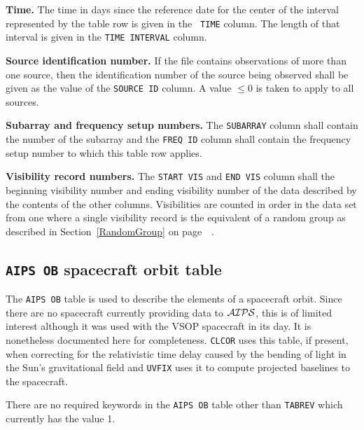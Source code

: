 \documentclass[twoside]{article}
\newcommand{\AIPS}{{$\cal AIPS\/$}}
\begin{document}
{\bf Time.} The time in days since the reference date for the center
of the interval represented by the table row is given in the {\tt
  TIME} column.  The length of that interval is given in the {\tt TIME
  INTERVAL} column.

{\bf Source identification number.} If the file contains observations
of more than one source, then the identification number of the source
being observed shall be given as the value of the {\tt SOURCE ID}
column.  A value $\leq 0$ is taken to apply to all sources.

{\bf Subarray and frequency setup numbers.}  The {\tt SUBARRAY} column
shall contain the number of the subarray  and the {\tt FREQ ID} column
shall contain the frequency setup number to which this table row
applies.

{\bf Visibility record numbers.} The {\tt START VIS} and {\tt END VIS}
column shall the beginning visibility number and ending visibility
number of the data described by the contents of the other columns.
Visibilities are counted in order in the data set from one where a
single visibility record is the equivalent of a random group as
described in Section~\ref{RandomGroup} on page~~\pageref{RandomGroup}.

\subsection{{\tt AIPS OB} spacecraft orbit table}
\label{s:OB}

The {\tt AIPS OB} table is used to describe the elements of a
spacecraft orbit.  Since there are no spacecraft currently providing
data to \AIPS, this is of limited interest although it was used with
the VSOP spacecraft in its day.  It is nonetheless documented here
for completeness.  {\tt CLCOR} uses this table, if present, when
correcting for the relativistic time delay caused by the bending of
light in the Sun's gravitational field and {\tt UVFIX} uses it to
compute projected baselines to the spacecraft.

There are no required keywords in the {\tt AIPS OB} table other than
{\tt TABREV} which currently has the value 1.
\end{document}
